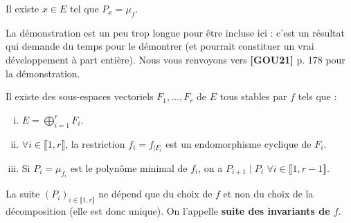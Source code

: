 
	\begin{lemma}
		\label{invariants-similitude-2}
		Il existe $x \in E$ tel que $P_x = \mu_f$.
	\end{lemma}

	\begin{remark}
		La démonstration est un peu trop longue pour être incluse ici : c'est un résultat qui demande du temps pour le démontrer (et pourrait constituer un vrai développement à part entière). Nous vous renvoyons vers \textbf{[GOU21]} p. 178 pour la démonstration.
	\end{remark}
	
	\begin{theorem}[Frobenius]
		Il existe des sous-espaces vectoriels $F_1, \dots, F_r$ de $E$ tous stables par $f$ tels que :
		\begin{enumerate}[(i)]
			\item $E = \bigoplus_{i = 1}^r F_i$.
			\item $\forall i \in \llbracket 1, r \rrbracket$, la restriction $f_i = f_{|F_i}$ est un endomorphisme cyclique de $F_i$.
			\item Si $P_i = \mu_{f_i}$ est le polynôme minimal de $f_i$, on a $P_{i+1} \mid P_i$ $\forall i \in \llbracket 1, r-1 \rrbracket$.
		\end{enumerate}
		La suite $(P_i)_{i \in \llbracket 1, r \rrbracket}$ ne dépend que du choix de $f$ et non du choix de la décomposition (elle est donc unique). On l'appelle \textbf{suite des invariants de $f$}.
	\end{theorem}
	
